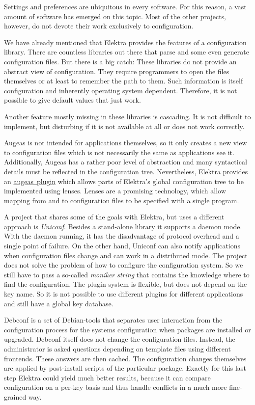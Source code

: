 Settings and preferences are ubiquitous in every software. For this reason, a vast amount of software has emerged on this topic. Most of the other projects, however, do not devote their work exclusively to configuration.

We have already mentioned that Elektra provides the features of a configuration library. There are countless libraries out there that parse and some even generate configuration files. But there is a big catch\+: These libraries do not provide an abstract view of configuration. They require programmers to open the files themselves or at least to remember the path to them. Such information is itself configuration and inherently operating system dependent. Therefore, it is not possible to give default values that just work.

Another feature mostly missing in these libraries is cascading. It is not difficult to implement, but disturbing if it is not available at all or does not work correctly.

Augeas is not intended for applications themselves, so it only creates a new view to configuration files which is not necessarily the same as applications see it. Additionally, Augeas has a rather poor level of abstraction and many syntactical details must be reflected in the configuration tree. Nevertheless, Elektra provides an \mbox{\hyperlink{autotoc_md44_src_plugins_augeas_README_md}{augeas plugin}} which allows parts of Elektra’s global configuration tree to be implemented using lenses. Lenses are a promising technology, which allow mapping from and to configuration files to be specified with a single program.

A project that shares some of the goals with Elektra, but uses a different approach is {\itshape Uniconf}. Besides a stand-\/alone library it supports a daemon mode. With the daemon running, it has the disadvantage of protocol overhead and a single point of failure. On the other hand, Uniconf can also notify applications when configuration files change and can work in a distributed mode. The project does not solve the problem of how to configure the configuration system. So we still have to pass a so-\/called {\itshape moniker string} that contains the knowledge where to find the configuration. The plugin system is flexible, but does not depend on the key name. So it is not possible to use different plugins for different applications and still have a global key database.

Debconf is a set of Debian-\/tools that separates user interaction from the configuration process for the system\textquotesingle{}s configuration when packages are installed or upgraded. Debconf itself does not change the configuration files. Instead, the administrator is asked questions depending on template files using different frontends. These answers are then cached. The configuration changes themselves are applied by post-\/install scripts of the particular package. Exactly for this last step Elektra could yield much better results, because it can compare configuration on a per-\/key basis and thus handle conflicts in a much more fine-\/grained way.

